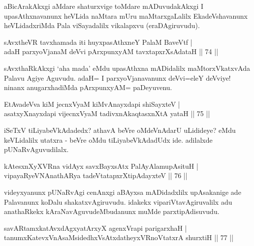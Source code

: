 \begin{artha} 
aBicArakAkxgi aMdare shaturxvige toMdare mADuvudakAkxgi I 
upasAthxnavanunx heVLida naMtara mUru maMtarxgaLalilx EkadeVshavanunx 
heVLidadxriMda Pala viSayadalilx vikalapxvu (eraDAgiruvudu).
\end{artha}


\begin{shl}
sAvxtheVR tavxhamada iti huyxpasAthxneY PalaM BaveVtf | \\
adaH parxyoVjanaM deVvi pArxpunxyAM tavxtapxrXsAdataH \hfill||  74 || 
\end{shl}

\begin{artha} 
sAvxthaRkAkxgi `aha mada' eMdu upasAthxna mADidalilx maMtorxVkatxvAda 
Palavu Agiye Aguvudu. adaH= I parxyoVjanavanunx deVvi=eleY deVviye! 
ninanx anugarxhadiMda pArxpunxyAM= paDeyuvenu.
\end{artha}


\begin{shl}
EtAvadeVva kiM jecnxVyaM kiMvA\s nayxdapi shiSayxteV | \\
asatxyXnayxdapi vijecnxVyaM tadivxnA\s kaqtasxnXtA yataH \hfill||  75 || 
\end{shl}

\begin{artha} 
iSeTxV tiLiyabeVkAdadedx? athavA beVre oMdeVnAdarU uLidideye? eMdu 
keVLidalilx utatxra - beVre oMdu tiLiyabeVkAdadUdx ide. adilalxde 
pUNaRvAguvudilalx.
\end{artha}

\begin{shl}
kAtesxnXyXVRna vidAyx savxBayxsAtx PalAyAlamupAsituH | \\
vipayaRyeVNAnathARya tadeVtatapxrXtipAdayxteV \hfill||  76 ||
\end{shl}

\begin{artha} 
videyxyanunx pUNaRvAgi cenAnxgi aBAyxsa mADidadxlilx upAsakanige ade 
Palavanunx koDalu shakatxvAgiruvudu. idakekx vipariVtavAgiruvalilx adu 
anathaRkekx kAraNavAguvudeMbudanunx muMde parxtipAdisuvudu.
\end{artha}

\begin{shl}
savARtamxkatAvxdAgxyatArxyX agenxVrapi parigarxhaH | \\
tanumxKatevxVnAsaMsidedhxVsAtxdatheyxVRnoVtatxrA shurxtiH \hfill||  77 || 
\end{shl}

